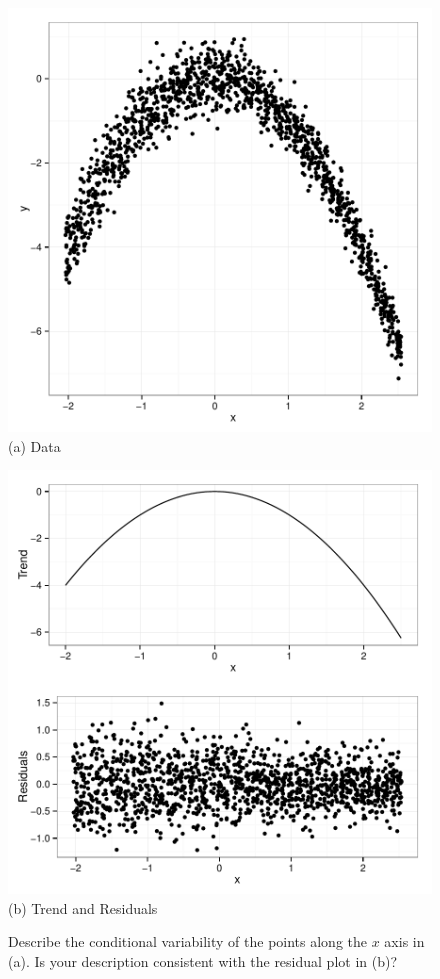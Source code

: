 \documentclass[11pt]{isuthesis}\usepackage[]{graphicx}\usepackage[]{color}
\begin{document}
\begin{figure} \hfill
\begin{minipage}[b]{.45\linewidth}
  \centering
  \includegraphics[width=\linewidth]{fig-cleveland1}\\
  (a) \small Data
\end{minipage} \hfill\hfill
\begin{minipage}[b]{.45\linewidth}
  \centering
  \includegraphics[width=\linewidth]{fig-cleveland2}\\
  (b) \small Trend and Residuals
\end{minipage} \hfill
\caption[Conditional variability]{Describe the conditional variability of the points along the $x$ axis in (a). Is your description consistent with the residual plot in (b)?}
\label{fig:cleveland-figure2}
\end{figure}
\end{document}
